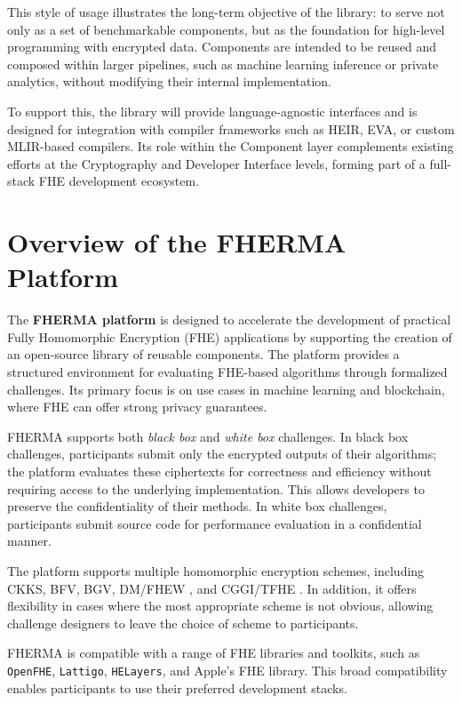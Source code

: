 \documentclass[article]{iacrtrans}
\begin{document}
This style of usage illustrates the long-term objective of the library: to serve not only as a set of benchmarkable components, but as the foundation for high-level programming with encrypted data. Components are intended to be reused and composed within larger pipelines, such as machine learning inference or private analytics, without modifying their internal implementation.

To support this, the library will provide language-agnostic interfaces and is designed for integration with compiler frameworks such as HEIR, EVA, or custom MLIR-based compilers. Its role within the Component layer complements existing efforts at the Cryptography and Developer Interface levels, forming part of a full-stack FHE development ecosystem.


\section{Overview of the FHERMA Platform}

The \textbf{FHERMA platform} is designed to accelerate the development of practical Fully Homomorphic Encryption (FHE) applications by supporting the creation of an open-source library of reusable components. The platform provides a structured environment for evaluating FHE-based algorithms through formalized challenges. Its primary focus is on use cases in machine learning and blockchain, where FHE can offer strong privacy guarantees.

FHERMA supports both \emph{black box} and \emph{white box} challenges. In black box challenges, participants submit only the encrypted outputs of their algorithms; the platform evaluates these ciphertexts for correctness and efficiency without requiring access to the underlying implementation. This allows developers to preserve the confidentiality of their methods. In white box challenges, participants submit source code for performance evaluation in a confidential manner.

The platform supports multiple homomorphic encryption schemes, including CKKS\cite{ckks:2016/421}, BFV\cite{bfv:2012/144}, BGV\cite{bgv:2011/277}, DM/FHEW \cite{dm:2014/816}, and CGGI/TFHE\cite{cggi:2016/870} . In addition, it offers flexibility in cases where the most appropriate scheme is not obvious, allowing challenge designers to leave the choice of scheme to participants. 

FHERMA is compatible with a range of FHE libraries and toolkits, such as \texttt{OpenFHE}\cite{openfhe:2022/915}, \texttt{Lattigo}\cite{lattigo}, \texttt{HELayers}\cite{helayers}, and Apple’s FHE library. This broad compatibility enables participants to use their preferred development stacks.
\end{document}
